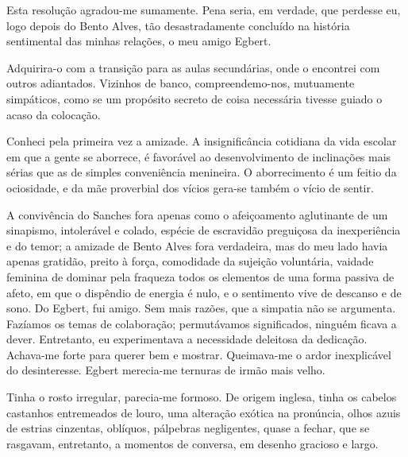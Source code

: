 Esta resolução
agradou{}-me sumamente. Pena seria, em verdade, que perdesse eu, logo
depois do Bento Alves, tão desastradamente concluído na história
sentimental das minhas relações, o meu amigo Egbert. 

Adquirira{}-o com a transição para as aulas secundárias, onde o encontrei com outros
adiantados. Vizinhos de banco, compreendemo{}-nos, mutuamente
simpáticos, como se um propósito secreto de coisa necessária tivesse
guiado o acaso da colocação. 

Conheci pela primeira vez a amizade. A
insignificância cotidiana da vida escolar em que a gente se aborrece, é
favorável ao desenvolvimento de inclinações mais sérias que as de
simples conveniência menineira. O aborrecimento é um feitio da
ociosidade, e da mãe proverbial dos vícios gera{}-se também o vício de
sentir. 

A convivência do Sanches fora apenas como o afeiçoamento
aglutinante de um sinapismo, intolerável e colado, espécie de
escravidão preguiçosa da inexperiência e do temor; a amizade de Bento
Alves fora verdadeira, mas do meu lado havia apenas gratidão, preito à
força, comodidade da sujeição voluntária, vaidade feminina de dominar
pela fraqueza todos os elementos de uma forma passiva de afeto, em que
o dispêndio de energia é nulo, e o sentimento vive de descanso e de
sono. Do Egbert, fui amigo. Sem mais razões, que a simpatia não se
argumenta. Fazíamos os temas de colaboração; permutávamos significados,
ninguém ficava a dever. Entretanto, eu experimentava a necessidade
deleitosa da dedicação. Achava{}-me forte para querer bem e mostrar.
Queimava{}-me o ardor inexplicável do desinteresse. Egbert merecia{}-me
ternuras de irmão mais velho. 

Tinha o rosto irregular, parecia{}-me
formoso. De origem inglesa, tinha os cabelos castanhos
entremeados de louro, uma alteração exótica na pronúncia, olhos azuis de
estrias cinzentas, oblíquos, pálpebras negligentes, quase a fechar, que
se rasgavam, entretanto, a momentos de conversa, em desenho gracioso e
largo. 

